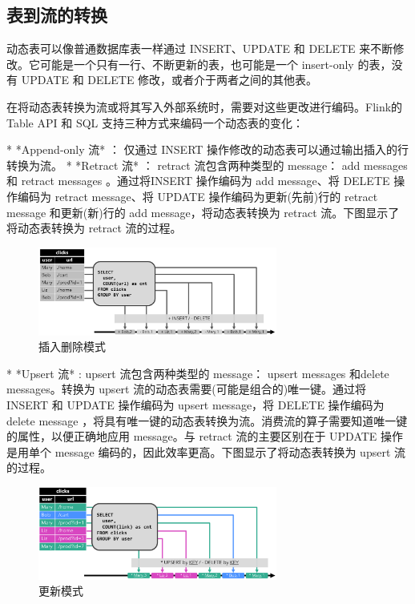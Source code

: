 \documentclass[cn,11pt,chinese]{elegantbook}
\begin{document}
\subsection{表到流的转换}

动态表可以像普通数据库表一样通过 INSERT、UPDATE 和 DELETE 来不断修改。它可能是一个只有一行、不断更新的表，也可能是一个 insert-only 的表，没有 UPDATE 和 DELETE 修改，或者介于两者之间的其他表。

在将动态表转换为流或将其写入外部系统时，需要对这些更改进行编码。Flink的 Table API 和 SQL 支持三种方式来编码一个动态表的变化：

* *Append-only 流* ： 仅通过 INSERT 操作修改的动态表可以通过输出插入的行转换为流。
* *Retract 流* ： retract 流包含两种类型的 message： add messages 和 retract messages 。通过将INSERT 操作编码为 add message、将 DELETE 操作编码为 retract message、将 UPDATE 操作编码为更新(先前)行的 retract message 和更新(新)行的 add message，将动态表转换为 retract 流。下图显示了将动态表转换为 retract 流的过程。

\begin{figure}[htbp]
    \centering
    \includegraphics[width=0.7\textwidth]{images/undo-redo-mode.png}
    \caption{插入删除模式}
\end{figure}

* *Upsert 流* : upsert 流包含两种类型的 message： upsert messages 和delete messages。转换为 upsert 流的动态表需要(可能是组合的)唯一键。通过将 INSERT 和 UPDATE 操作编码为 upsert message，将 DELETE 操作编码为 delete message ，将具有唯一键的动态表转换为流。消费流的算子需要知道唯一键的属性，以便正确地应用 message。与 retract 流的主要区别在于 UPDATE 操作是用单个 message 编码的，因此效率更高。下图显示了将动态表转换为 upsert 流的过程。

\begin{figure}[htbp]
    \centering
    \includegraphics[width=0.7\textwidth]{images/redo-mode.png}
    \caption{更新模式}
\end{figure}
\end{document}
